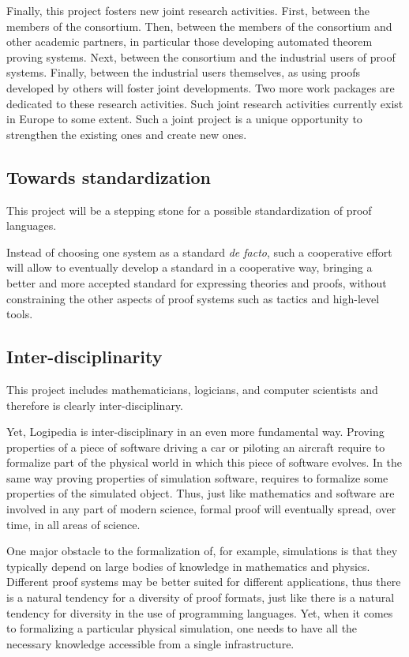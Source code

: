 Finally, this project fosters new joint research activities. First,
between the members of the consortium. Then, between the members of
the consortium and other academic partners, in particular those
developing automated theorem proving systems. Next, between the
consortium and the industrial users of proof systems. Finally, between
the industrial users themselves, as using proofs developed by others
will foster joint developments. Two more work packages are dedicated
to these research activities.  Such joint research activities
currently exist in Europe to some extent.  Such a joint project is a
unique opportunity to strengthen the existing ones and create new
ones.

\subsection{Towards standardization}
This project will be a stepping stone for a possible standardization
of proof languages.

Instead of choosing one system as a standard {\em de facto}, such a
cooperative effort will allow to eventually develop a standard in a
cooperative way, bringing a better and more accepted standard for
expressing theories and proofs, without constraining the other aspects
of proof systems such as tactics and high-level tools.

\subsection{Inter-disciplinarity}
This project includes mathematicians, logicians, and computer
scientists and therefore is clearly inter-disciplinary.

Yet, Logipedia is inter-disciplinary in an even more fundamental
way. Proving properties of a piece of software driving a car or
piloting an aircraft require to formalize part of the physical world
in which this piece of software evolves. In the same way proving
properties of simulation software, requires to formalize some
properties of the simulated object.  Thus, just like mathematics and
software are involved in any part of modern science, formal proof will
eventually spread, over time, in all areas of science.

One major obstacle to the formalization of, for example, simulations
is that they typically depend on large bodies of knowledge in
mathematics and physics.  Different proof systems may be better
suited for different applications, thus there is a natural tendency
for a diversity of proof formats, just like there is a natural
tendency for diversity in the use of programming languages.  Yet, when
it comes to formalizing a particular physical simulation, one needs to
have all the necessary knowledge accessible from a single infrastructure.


